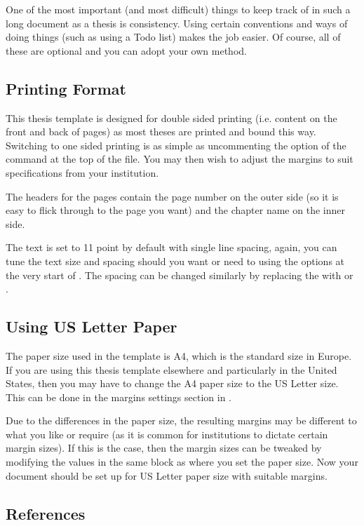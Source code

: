 One of the most important (and most difficult) things to keep track of in such a long document as a thesis is consistency. Using certain conventions and ways of doing things (such as using a Todo list) makes the job easier. Of course, all of these are optional and you can adopt your own method.

\subsection{Printing Format}

This thesis template is designed for double sided printing (i.e. content on the front and back of pages) as most theses are printed and bound this way. Switching to one sided printing is as simple as uncommenting the  option of the  command at the top of the  file. You may then wish to adjust the margins to suit specifications from your institution.

The headers for the pages contain the page number on the outer side (so it is easy to flick through to the page you want) and the chapter name on the inner side.

The text is set to 11 point by default with single line spacing, again, you can tune the text size and spacing should you want or need to using the options at the very start of . The spacing can be changed similarly by replacing the  with  or .

\subsection{Using US Letter Paper}

The paper size used in the template is A4, which is the standard size in Europe. If you are using this thesis template elsewhere and particularly in the United States, then you may have to change the A4 paper size to the US Letter size. This can be done in the margins settings section in .

Due to the differences in the paper size, the resulting margins may be different to what you like or require (as it is common for institutions to dictate certain margin sizes). If this is the case, then the margin sizes can be tweaked by modifying the values in the same block as where you set the paper size. Now your document should be set up for US Letter paper size with suitable margins.

\subsection{References}

